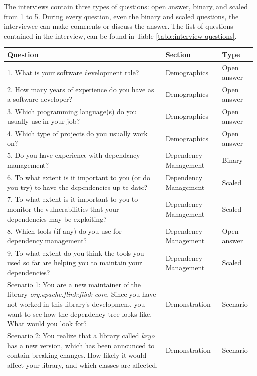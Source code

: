 The interviews contain three types of questions: open answer, binary, and scaled from 1 to 5. During every question, even the binary and scaled questions, the interviewee can make comments or discuss the answer. The list of questions contained in the interview, can be found in Table \ref{table:interview-questions}.

\begin{table}[p]
    \begin{center}
    \begin{tabularx}{\textwidth}{|X|l|l|}
    \hline
    Question & Section & Type \\\hline
    \hline
    1.  What is your software development role?  & Demographics & Open answer \\\hline
    2.	How many years of experience do you have as a software developer? & Demographics & Open answer \\\hline
    3.	Which programming language(s) do you usually use in your job? & Demographics & Open answer \\\hline
    4.	Which type of projects do you usually work on? & Demographics & Open answer \\\hline
    \hline
    5.	Do you have experience with dependency management? & Dependency Management & Binary \\\hline
    6.	To what extent is it important to you (or do you try) to have the dependencies up to date? & Dependency Management & Scaled \\\hline
    7.	To what extent is it important to you to monitor the vulnerabilities that your dependencies may be exploiting? & Dependency Management & Scaled \\\hline
    8.	Which tools (if any) do you use for dependency management? & Dependency Management & Open answer \\\hline
    9.	To what extent do you think the tools you used so far are helping you to maintain your dependencies? & Dependency Management & Scaled \\\hline
    \hline
    Scenario 1: You are a new maintainer of the library \textit{org.apache.flink:flink-core}. Since you have not worked in this library's development, you want to see how the dependency tree looks like. What would you look for? & Demonstration & Scenario \\\hline
    Scenario 2: You realize that a library called \textit{kryo} has a new version, which has been announced to contain breaking changes. How likely it would affect your library, and which classes are affected. & Demonstration & Scenario \\\hline

\end{tabularx}
\end{center}
\end{table}
